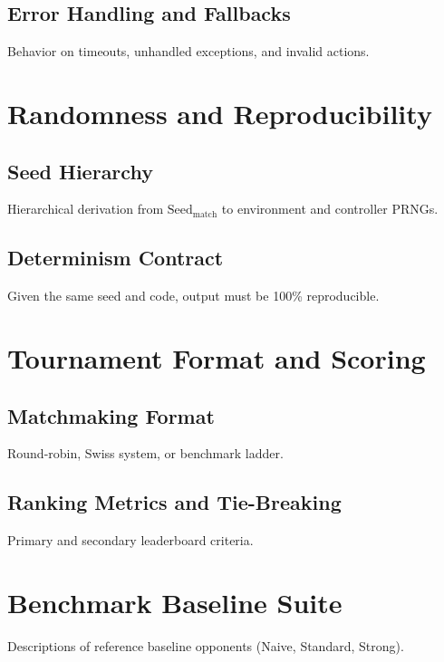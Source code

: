 \documentclass[11pt,a4paper]{article}
\begin{document}
\subsection{Error Handling and Fallbacks}
Behavior on timeouts, unhandled exceptions, and invalid actions.


\section{Randomness and Reproducibility}

\subsection{Seed Hierarchy}
Hierarchical derivation from $\text{Seed}_{\text{match}}$ to environment and controller PRNGs.

\subsection{Determinism Contract}
Given the same seed and code, output must be 100\% reproducible.


\section{Tournament Format and Scoring}

\subsection{Matchmaking Format}
Round-robin, Swiss system, or benchmark ladder.

\subsection{Ranking Metrics and Tie-Breaking}
Primary and secondary leaderboard criteria.


\section{Benchmark Baseline Suite}
Descriptions of reference baseline opponents (Naive, Standard, Strong).
\end{document}

